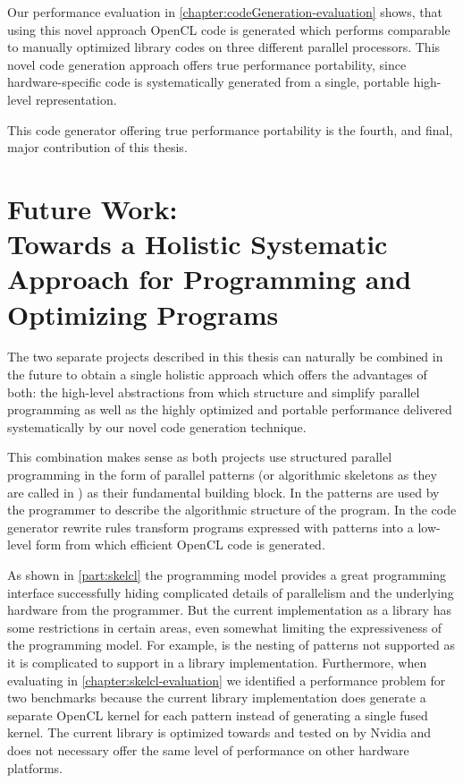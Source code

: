 Our performance evaluation in \autoref{chapter:codeGeneration-evaluation} shows, that using this novel approach OpenCL code is generated which performs comparable to manually optimized library codes on three different parallel processors.
This novel code generation approach offers true performance portability, since hardware-specific code is systematically generated from a single, portable high-level representation.

\bigskip
This code generator offering true performance portability is the fourth, and final, major contribution of this thesis.


\section[Future Work]{Future Work:\\ Towards a Holistic Systematic Approach for Programming and Optimizing Programs}
\label{section:future-work}
The two separate projects described in this thesis can naturally be combined in the future to obtain a single holistic approach which offers the advantages of both:
the high-level abstractions from \SkelCL which structure and simplify parallel programming as well as the highly optimized and portable performance delivered systematically by our novel code generation technique.

This combination makes sense as both projects use structured parallel programming in the form of parallel patterns (or algorithmic skeletons as they are called in \SkelCL) as their fundamental building block.
In \SkelCL the patterns are used by the programmer to describe the algorithmic structure of the program.
In the code generator rewrite rules transform programs expressed with patterns into a low-level form from which efficient OpenCL code is generated.

As shown in \autoref{part:skelcl} the \SkelCL programming model provides a great programming interface successfully hiding complicated details of parallelism and the underlying hardware from the programmer.
But the current implementation as a \Cpp library has some restrictions in certain areas, even somewhat limiting the expressiveness of the programming model.
For example, is the nesting of patterns not supported as it is complicated to support in a library implementation.
Furthermore, when evaluating \SkelCL in \autoref{chapter:skelcl-evaluation} we identified a performance problem for two benchmarks because the current \SkelCL library implementation does generate a separate OpenCL kernel for each pattern instead of generating a single fused kernel.
The current library is optimized towards and tested on \GPUs by Nvidia and does not necessary offer the same level of performance on other hardware platforms.

